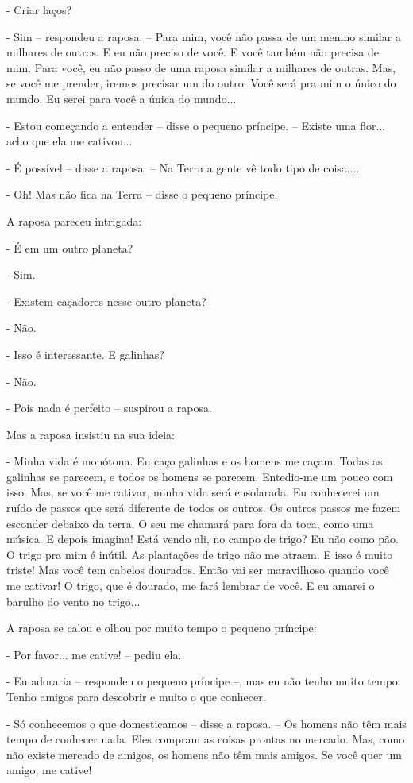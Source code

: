 - Criar laços?

- Sim -- respondeu a raposa. -- Para mim, você não passa de um menino
similar a milhares de outros. E eu não preciso de você. E você também
não precisa de mim. Para você, eu não passo de uma raposa similar a
milhares de outras. Mas, se você me prender, iremos precisar um do
outro. Você será pra mim o único do mundo. Eu serei para você a única do
mundo...

- Estou começando a entender -- disse o pequeno príncipe. -- Existe uma
flor... acho que ela me cativou...

- É possível -- disse a raposa. -- Na Terra a gente vê todo tipo de
coisa....

- Oh! Mas não fica na Terra -- disse o pequeno príncipe.

A raposa pareceu intrigada:

- É em um outro planeta?

- Sim.

- Existem caçadores nesse outro planeta?

- Não.

- Isso é interessante. E galinhas?

- Não.

- Pois nada é perfeito -- suspirou a raposa.

Mas a raposa insistiu na sua ideia:

- Minha vida é monótona. Eu caço galinhas e os homens me caçam. Todas as
galinhas se parecem, e todos os homens se parecem. Entedio-me um pouco
com isso. Mas, se você me cativar, minha vida será ensolarada. Eu
conhecerei um ruído de passos que será diferente de todos os outros. Os
outros passos me fazem esconder debaixo da terra. O seu me chamará para
fora da toca, como uma música. E depois imagina! Está vendo ali, no
campo de trigo? Eu não como pão. O trigo pra mim é inútil. As plantações
de trigo não me atraem. E isso é muito triste! Mas você tem cabelos
dourados. Então vai ser maravilhoso quando você me cativar! O trigo, que
é dourado, me fará lembrar de você. E eu amarei o barulho do vento no
trigo...

A raposa se calou e olhou por muito tempo o pequeno príncipe:

- Por favor... me cative! -- pediu ela.

- Eu adoraria -- respondeu o pequeno príncipe --, mas eu não tenho muito
tempo. Tenho amigos para descobrir e muito o que conhecer.

- Só conhecemos o que domesticamos -- disse a raposa. -- Os homens não
têm mais tempo de conhecer nada. Eles compram as coisas prontas no
mercado. Mas, como não existe mercado de amigos, os homens não têm mais
amigos. Se você quer um amigo, me cative!

